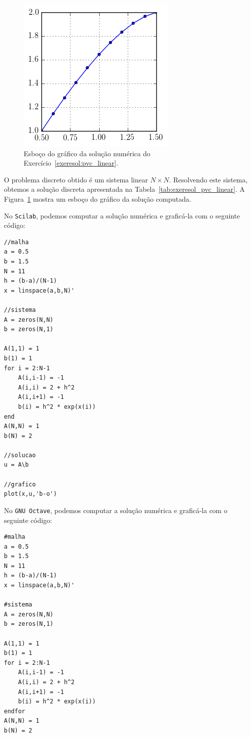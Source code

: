 \begin{resol}
\begin{figure}
  \centering
  \includegraphics{./cap_pvc/pics/exeresol_pvc_linear/exeresol_pvc_linear}
  \caption{Esboço do gráfico da solução numérica do Exercício~\ref{exeresol:pvc_linear}.}
  \label{fig:exeresol_pvc_linear}
\end{figure}

O problema discreto obtido é um sistema linear $N\times N$. Resolvendo este sistema, obtemos a solução discreta apresentada na Tabela~\ref{tab:exeresol_pvc_linear}. A Figura~\ref{fig:exeresol_pvc_linear} mostra um esboço do gráfico da solução computada.

\ifisscilab
No \verb+Scilab+, podemos computar a solução numérica e graficá-la com o seguinte código:
\begin{verbatim}
//malha
a = 0.5
b = 1.5
N = 11
h = (b-a)/(N-1)
x = linspace(a,b,N)'

//sistema
A = zeros(N,N)
b = zeros(N,1)

A(1,1) = 1
b(1) = 1
for i = 2:N-1
    A(i,i-1) = -1
    A(i,i) = 2 + h^2
    A(i,i+1) = -1
    b(i) = h^2 * exp(x(i))
end
A(N,N) = 1
b(N) = 2

//solucao
u = A\b

//grafico
plot(x,u,'b-o')
\end{verbatim}
\fi
\ifisoctave
No \verb+GNU Octave+, podemos computar a solução numérica e graficá-la com o seguinte código:
\begin{verbatim}
#malha
a = 0.5
b = 1.5
N = 11
h = (b-a)/(N-1)
x = linspace(a,b,N)'

#sistema
A = zeros(N,N)
b = zeros(N,1)

A(1,1) = 1
b(1) = 1
for i = 2:N-1
    A(i,i-1) = -1
    A(i,i) = 2 + h^2
    A(i,i+1) = -1
    b(i) = h^2 * exp(x(i))
endfor
A(N,N) = 1
b(N) = 2


\end{verbatim}
\end{resol}
